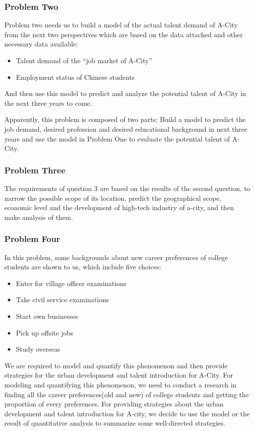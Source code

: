\documentclass{mcmthesis}
\begin{document}
\subsubsection{Problem Two}
\noindent
Problem two needs us to build a model of the actual talent demand of A-City from the next two perspectives which are based on the data attached and other necessary data available:
\begin{itemize}
\item Talent demand of the ``job market of A-City''
\item Employment status of Chinese students
\end{itemize}
And then use this model to predict and analyze the potential talent of A-City in the next three years to come.
\par\noindent
Apparently, this problem is composed of two parts: Build a model to predict the job demand, desired profession and desired educational background in next three years and use the model in Problem One to evaluate the potential talent of A-City.

\subsubsection{Problem Three}
The requirements of question 3 are based on the results of the second question, to narrow the possible scope of its location, predict the geographical scope, economic level and the development of high-tech industry of a-city, and then make analysis of them.


\subsubsection{Problem Four}
In this problem, some backgrounds about new career preferences of college students are shown to us, which include five choices: 
\begin{itemize}
	\item Enter for village officer examinations
	\item Take civil service examinations
	\item Start own businesses
	\item Pick up offsite jobs
	\item Study overseas
\end{itemize}
We are required to model and quantify this phenomenon and then provide strategies for the urban development and talent introduction for A-City. For modeling and quantifying this phenomenon, we need to conduct a research in finding all the career preferences(old and new) of college students and getting the proportion of every preferences. For providing strategies about the urban development and talent introduction for A-city, we decide to use the model or the result of quantitative analysis to summarize some well-directed strategies.  
\end{document}
